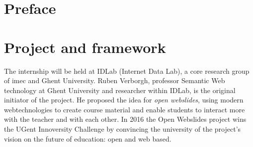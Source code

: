 \documentclass[10pt,a4paper]{article}
\makeatletter
\newcommand{\coursename}{Internship Applied Computer Science}
\newcommand{\courseyear}{Academy year 2017-2018}
\newcommand{\documenttitle}{Internship report}
\newcommand{\authoronename}{Jasper D'haene}
\newcommand{\authoroneemail}{jasper.dhaene@gmail.com}
\newcommand{\authortwoname}{Florian Dejonckheere}
\newcommand{\authortwoemail}{florian@dejonckhee.re}
\newcommand{\hogentlogo}{hogent-logo.png}
\newcommand{\hogentheader}{header.png}
\newcommand{\florian}[1]{\ifthenelse{\isundefined{\isflorian}}{}{#1}}
\newcommand{\jasper}[1]{\ifthenelse{\isundefined{\isjasper}}{}{#1}}
\newcommand{\isflorian}{}
\makeatother
\begin{document}

  \nopagecolor
  \renewcommand{\footrulewidth}{0.4pt}
  \headheight 45pt
  \ULCornerWallPaper{1}{\hogentheader}
  \fancyfoot[C]{\thepage}

  \tableofcontents

  \cleardoublepage{}

  \section{Preface}

  \section{Project and framework}
    The internship will be held at IDLab (Internet Data Lab), a core research group of imec and Ghent University. Ruben Verborgh, professor Semantic Web technology at Ghent University and researcher within IDLab, is the original initiator of the project. He proposed the idea for \textit{open webslides}, using modern webtechnologies to create course material and enable students to interact more with the teacher and with each other. In 2016 the Open Webslides project wins the UGent Innoversity Challenge by convincing the university of the project's vision on the future of education: open and web based.
    
\end{document}
